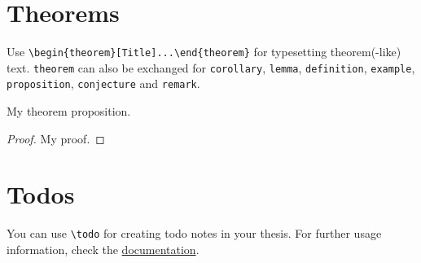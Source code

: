 \section{Theorems}

Use \verb|\begin{theorem}[Title]...\end{theorem}| for typesetting theorem(-like) text.
\verb|theorem| can also be exchanged for \verb|corollary|, \verb|lemma|, \verb|definition|, \verb|example|, \verb|proposition|, \verb|conjecture| and \verb|remark|.
\begin{theorem}[My Theorem]
    My theorem proposition.
\end{theorem}
\begin{proof}
    My proof.
\end{proof}

\section{Todos}

You can use \verb|\todo| for creating todo notes in your thesis.
For further usage information, check the \href{https://tug.ctan.org/macros/latex/contrib/todonotes/todonotes.pdf}{documentation}.
